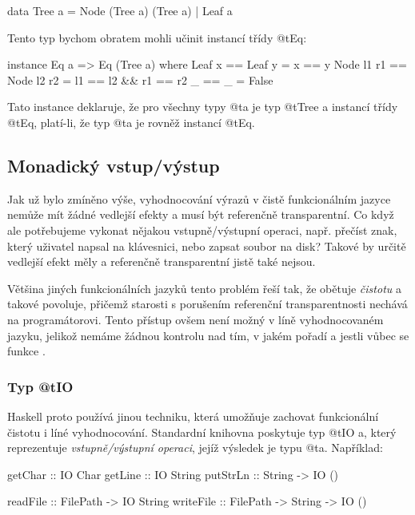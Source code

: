 \begin{haskell}
data Tree a = Node (Tree a) (Tree a) | Leaf a
\end{haskell}

Tento typ bychom obratem mohli učinit instancí třídy @t{Eq}:

\begin{haskell}
instance Eq a => Eq (Tree a) where
  Leaf x == Leaf y         = x == y
  Node l1 r1 == Node l2 r2 = l1 == l2 && r1 == r2
  _ == _ = False
\end{haskell}

Tato instance deklaruje, že pro všechny typy @t{a} je typ @t{Tree a} instancí
třídy @t{Eq}, platí-li, že typ @t{a} je rovněž instancí @t{Eq}.

\subsection{Monadický vstup/výstup}

Jak už bylo zmíněno výše, vyhodnocování výrazů v čistě funkcionálním jazyce
nemůže mít žádné vedlejší efekty a musí být referenčně transparentní. Co když
ale potřebujeme vykonat nějakou vstupně/výstupní operaci, např. přečíst znak,
který uživatel napsal na klávesnici, nebo zapsat soubor na disk? Takové
 by určitě vedlejší efekt měly a referenčně transparentní jistě také
nejsou.

Většina jiných funkcionálních jazyků tento problém řeší tak, že obětuje
\emph{čistotu} a takové  povoluje, přičemž starosti s
porušením referenční transparentnosti nechává na programátorovi. Tento přístup
ovšem není možný v líně vyhodnocovaném jazyku, jelikož nemáme žádnou kontrolu
nad tím, v jakém pořadí a jestli vůbec se funkce .

\subsubsection{\texorpdfstring{Typ @t{IO}}{Typ IO}}

Haskell proto používá jinou techniku, která umožňuje zachovat funkcionální
čistotu i líné vyhodnocování. Standardní knihovna poskytuje typ @t{IO a}, který
reprezentuje \emph{vstupně/výstupní operaci}, jejíž výsledek je typu @t{a}.
Například:

\begin{haskell}
getChar :: IO Char
getLine :: IO String
putStrLn :: String -> IO ()

readFile :: FilePath -> IO String
writeFile :: FilePath -> String -> IO ()
\end{haskell}

